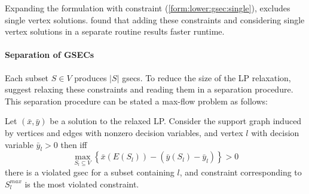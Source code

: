  Expanding the formulation with constraint (\ref{form:lower:gsec:single}), excludes single vertex solutions.
 \citet{lucena2004strong} found that adding these constraints and
 considering single vertex solutions in a separate routine results faster runtime.

 \paragraph{Separation of GSECs} Each subset $S \in V$ produces $|S|$ \glspl{gsec}. To reduce the size of the LP relaxation,
 \citet{lucena2004strong} suggest relaxing these constraints and reading them in a separation procedure.
 This separation procedure can be stated a max-flow problem as follows:

 Let $(\bar{x}, \bar{y})$ be a solution to the relaxed LP. Consider the support graph induced by vertices and edges with nonzero decision variables,
  and vertex $l$ with decision variable $\bar y_l > 0$
  then iff
  $$\max_{S_l \subseteq V} \left\{ \bar x (E(S_l)) - (\bar y (S_l) - \bar y_l) \right\} > 0$$
  there is a violated \gls{gsec} for a subset containing $l$, and constraint corresponding to $S_l^{max}$ is the most violated constraint.

